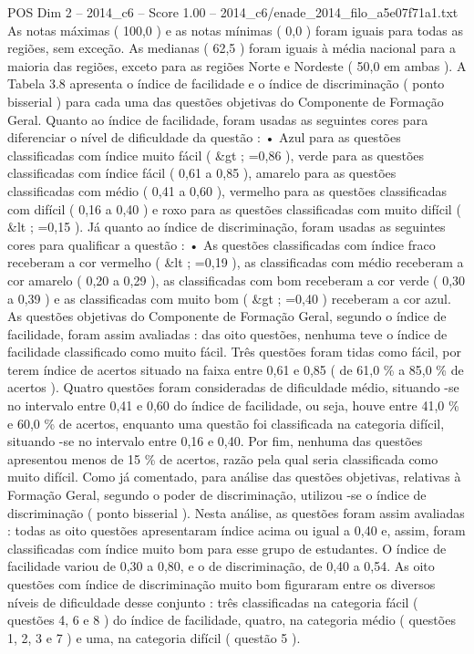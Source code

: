 \begin{textsample}{POS Dim 2 – 2014\_c6 – Score 1.00 – 2014\_c6/enade\_2014\_filo\_a5e07f71a1.txt}
As notas máximas ( 100,0 ) e as notas mínimas ( 0,0 ) foram iguais para todas as regiões, sem exceção.
As medianas ( 62,5 ) foram iguais à média nacional para a maioria das regiões, exceto para as regiões Norte e Nordeste ( 50,0 em ambas ).
A Tabela 3.8 apresenta o índice de facilidade e o índice de discriminação ( ponto bisserial ) para cada uma das questões objetivas do Componente de Formação Geral.
Quanto ao índice de facilidade, foram usadas as seguintes cores para diferenciar o nível de dificuldade da questão : • Azul para as questões classificadas com índice muito fácil ( \&gt ; =0,86 ), verde para as questões classificadas com índice fácil ( 0,61 a 0,85 ), amarelo para as questões classificadas com médio ( 0,41 a 0,60 ), vermelho para as questões classificadas com difícil ( 0,16 a 0,40 ) e roxo para as questões classificadas com muito difícil ( \&lt ; =0,15 ).
Já quanto ao índice de discriminação, foram usadas as seguintes cores para qualificar a questão : • As questões classificadas com índice fraco receberam a cor vermelho ( \&lt ; =0,19 ), as classificadas com médio receberam a cor amarelo ( 0,20 a 0,29 ), as classificadas com bom receberam a cor verde ( 0,30 a 0,39 ) e as classificadas com muito bom ( \&gt ; =0,40 ) receberam a cor azul.
As questões objetivas do Componente de Formação Geral, segundo o índice de facilidade, foram assim avaliadas : das oito questões, nenhuma teve o índice de facilidade classificado como muito fácil.
Três questões foram tidas como fácil, por terem índice de acertos situado na faixa entre 0,61 e 0,85 ( de 61,0 \% a 85,0 \% de acertos ).
Quatro questões foram consideradas de dificuldade médio, situando -se no intervalo entre 0,41 e 0,60 do índice de facilidade, ou seja, houve entre 41,0 \% e 60,0 \% de acertos, enquanto uma questão foi classificada na categoria difícil, situando -se no intervalo entre 0,16 e 0,40.
Por fim, nenhuma das questões apresentou menos de 15 \% de acertos, razão pela qual seria classificada como muito difícil.
Como já comentado, para análise das questões objetivas, relativas à Formação Geral, segundo o poder de discriminação, utilizou -se o índice de discriminação ( ponto bisserial ).
Nesta análise, as questões foram assim avaliadas : todas as oito questões apresentaram índice acima ou igual a 0,40 e, assim, foram classificadas com índice muito bom para esse grupo de estudantes.
O índice de facilidade variou de 0,30 a 0,80, e o de discriminação, de 0,40 a 0,54.
As oito questões com índice de discriminação muito bom figuraram entre os diversos níveis de dificuldade desse conjunto : três classificadas na categoria fácil ( questões 4, 6 e 8 ) do índice de facilidade, quatro, na categoria médio ( questões 1, 2, 3 e 7 ) e uma, na categoria difícil ( questão 5 ).

\end{textsample}
